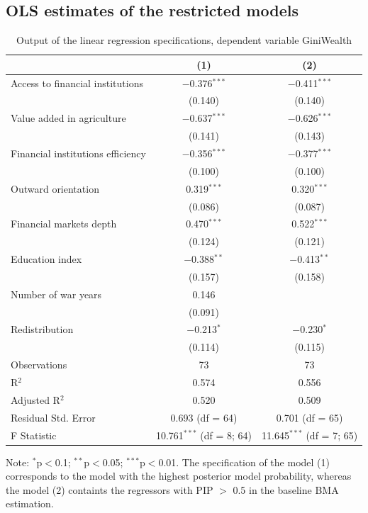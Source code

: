 \begin{refsection}
\begin{subappendices}
    \section{\ac{OLS} estimates of the restricted models}
    \begin{table}[!htbp] 
    \centering 
    \caption{Output of the linear regression specifications, dependent variable GiniWealth} 
    \label{ch3res:ols}
    \begin{threeparttable}
    \begin{tabular}{@{\extracolsep{5pt}}lcc} 
    \toprule
      & (1) & (2) \\ 
    \midrule
     Access to financial institutions & $-$0.376$^{***}$ & $-$0.411$^{***}$ \\ 
      & (0.140) & (0.140) \\ 
     Value added in agriculture & $-$0.637$^{***}$ & $-$0.626$^{***}$ \\ 
      & (0.141) & (0.143) \\ 
     Financial institutions efficiency & $-$0.356$^{***}$ & $-$0.377$^{***}$ \\ 
      & (0.100) & (0.100) \\ 
     Outward orientation & 0.319$^{***}$ & 0.320$^{***}$ \\ 
      & (0.086) & (0.087) \\ 
     Financial markets depth & 0.470$^{***}$ & 0.522$^{***}$ \\ 
      & (0.124) & (0.121) \\ 
     Education index & $-$0.388$^{**}$ & $-$0.413$^{**}$ \\ 
      & (0.157) & (0.158) \\ 
     Number of war years & 0.146 &  \\ 
      & (0.091) &  \\ 
     Redistribution & $-$0.213$^{*}$ & $-$0.230$^{*}$ \\ 
      & (0.114) & (0.115) \\ 
    \midrule 
    Observations & 73 & 73 \\ 
    R$^{2}$ & 0.574 & 0.556 \\ 
    Adjusted R$^{2}$ & 0.520 & 0.509 \\ 
    Residual Std. Error & 0.693 (df = 64) & 0.701 (df = 65) \\ 
    F Statistic & 10.761$^{***}$ (df = 8; 64) & 11.645$^{***}$ (df = 7; 65) 
    \end{tabular}
    \begin{tablenotes}
    \footnotesize
    \item Note: {$^{*}$p$<$0.1; $^{**}$p$<$0.05; $^{***}$p$<$0.01.} The specification of the model (1) corresponds to the model with the highest posterior model probability, whereas the model (2) containts the regressors with \ac{PIP} $>$ 0.5 in the baseline \ac{BMA} estimation.
    \end{tablenotes}
    \end{threeparttable}
    \end{table}
    \clearpage
    

\end{subappendices}
\end{refsection}
